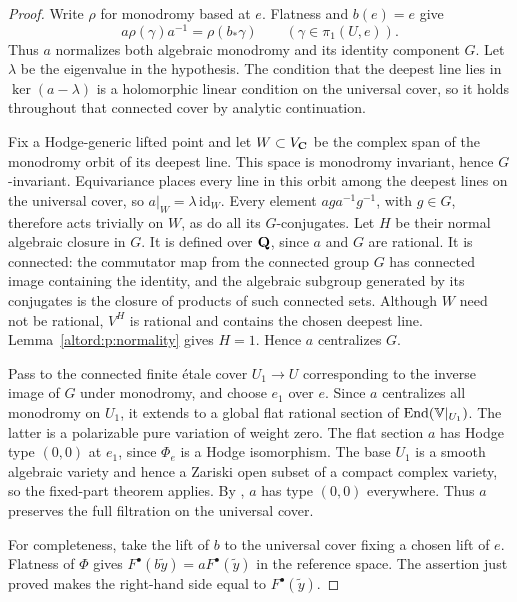 \begin{proof}
Write $\rho$ for monodromy based at $e$.  Flatness and $b(e)=e$ give
\[
  a\rho(\gamma)a^{-1}=\rho(b_*\gamma)
  \qquad (\gamma\in\pi_1(U,e)).
\]
Thus $a$ normalizes both algebraic monodromy and its identity component
$G$.  Let $\lambda$ be the eigenvalue in the hypothesis.  The condition
that the deepest line lies in $\ker(a-\lambda)$ is a holomorphic linear
condition on the universal cover, so it holds throughout that connected
cover by analytic continuation.

Fix a Hodge-generic lifted point and let $W\subset V_{\mathbf C}$ be the complex span
of the monodromy orbit of its deepest line.  This space is monodromy
invariant, hence $G$-invariant. Equivariance places every line in this
orbit among the deepest lines on the universal cover, so
$a|_W=\lambda\,\mathrm{id}_W$.
Every element $aga^{-1}g^{-1}$, with $g\in G$, therefore acts trivially
on $W$, as do all its $G$-conjugates.  Let $H$ be their normal algebraic
closure in $G$.  It is defined over $\mathbf Q$, since $a$ and $G$ are rational.
It is connected: the commutator map from the connected group $G$ has
connected image containing the identity, and the algebraic subgroup
generated by its conjugates is the closure of products of such
connected sets. Although $W$ need not be rational, $V^H$ is rational
and contains the chosen deepest line.
Lemma~\ref{altord:p:normality} gives $H=1$.  Hence $a$ centralizes $G$.

Pass to the connected finite \'etale cover $U_1\to U$ corresponding to
the inverse image of $G$ under monodromy, and choose $e_1$ over $e$.
Since $a$ centralizes all monodromy on $U_1$, it extends to a global flat
rational section of $\operatorname{End}(\mathbb V|_{U_1})$.  The latter is a polarizable
pure variation of weight zero. The flat section $a$ has Hodge type
$(0,0)$ at $e_1$, since $\Phi_e$ is a Hodge isomorphism. The base
$U_1$ is a smooth algebraic variety and hence a Zariski open subset
of a compact complex variety, so the fixed-part theorem applies.
By \cite[Theorem~7.22 and Corollary~7.23]{Schmid}, $a$ has type
$(0,0)$ everywhere. Thus $a$ preserves the full filtration on the
universal cover.

For completeness, take the lift of $b$ to the universal cover fixing a
chosen lift of $e$.  Flatness of $\Phi$ gives
$F^\bullet(b\widetilde y)=aF^\bullet(\widetilde y)$ in the reference
space.  The assertion just proved makes the right-hand side equal to
$F^\bullet(\widetilde y)$.
\end{proof}
